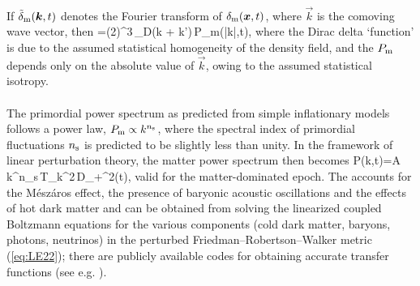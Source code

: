 {\\
If $\tilde\delta_{\rm m}(\vec k,t)$ denotes  the Fourier transform of
$\delta_{\rm m}(\vec x,t)$, where $\vec k$ is the comoving wave
vector, then
%
\be
{}
=(2\pi)^3\,\delta_{\rm D}(\vec k + \vec k')\,P_{\rm m}(|\vec k|,t)\;,
\label{eq:LSS6}
\ee
%
where the Dirac delta `function' is due to the assumed statistical
homogeneity of the density field, and the  $P_{\rm m}$ depends only on the
absolute value of $\vec k$, owing to the assumed statistical isotropy.
\\
\\
The primordial power spectrum as predicted from simple inflationary
models follows a power law, $P_{\rm m}\propto k^{n_{\rm s}}$, where
the spectral index of primordial fluctuations $n_{\rm s}$ is predicted
to be slightly less than unity.  In the framework of linear
perturbation theory, the matter power spectrum then becomes
%
\be
P(k,t)=A\,k^{n_{\rm s}}\,T_k^2\,D_+^2(t)\;,
\label{eq:LSS7}
\ee
%
valid for the matter-dominated epoch. The  accounts for the M\'esz\'aros
effect, the presence of baryonic acoustic oscillations and the effects
of hot dark matter and can be obtained from solving the linearized
coupled Boltzmann equations for the various components (cold dark
matter, baryons, photons, neutrinos) in the perturbed
Friedman--Robertson--Walker metric (\ref{eq:LE22}); there are publicly
available codes for obtaining accurate transfer functions (see e.g. \citep{1999ApJ...511....5E}).}
